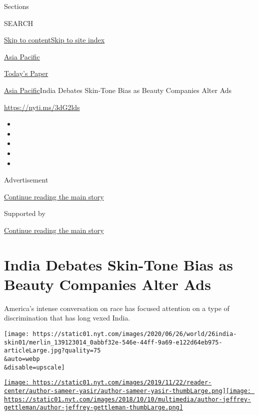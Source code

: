 Sections

SEARCH

\protect\hyperlink{site-content}{Skip to
content}\protect\hyperlink{site-index}{Skip to site index}

\href{https://www.nytimes.com/section/world/asia}{Asia Pacific}

\href{https://myaccount.nytimes.com/auth/login?response_type=cookie\&client_id=vi}{}

\href{https://www.nytimes.com/section/todayspaper}{Today's Paper}

\href{/section/world/asia}{Asia Pacific}\textbar{}India Debates
Skin-Tone Bias as Beauty Companies Alter Ads

\url{https://nyti.ms/3dG2lds}

\begin{itemize}
\item
\item
\item
\item
\item
\end{itemize}

Advertisement

\protect\hyperlink{after-top}{Continue reading the main story}

Supported by

\protect\hyperlink{after-sponsor}{Continue reading the main story}

\hypertarget{india-debates-skin-tone-bias-as-beauty-companies-alter-ads}{%
\section{India Debates Skin-Tone Bias as Beauty Companies Alter
Ads}\label{india-debates-skin-tone-bias-as-beauty-companies-alter-ads}}

America's intense conversation on race has focused attention on a type
of discrimination that has long vexed India.

\texttt{[image: https://static01.nyt.com/images/2020/06/26/world/26india-skin01/merlin\_139123014\_0abbf32e-546e-44ff-9a69-e122d64eb975-articleLarge.jpg?quality=75\\\&auto=webp\\\&disable=upscale]}

\href{https://www.nytimes.com/by/sameer-yasir}{\texttt{[image: https://static01.nyt.com/images/2019/11/22/reader-center/author-sameer-yasir/author-sameer-yasir-thumbLarge.png]}}\href{https://www.nytimes.com/by/jeffrey-gettleman}{\texttt{[image: https://static01.nyt.com/images/2018/10/10/multimedia/author-jeffrey-gettleman/author-jeffrey-gettleman-thumbLarge.png]}}


